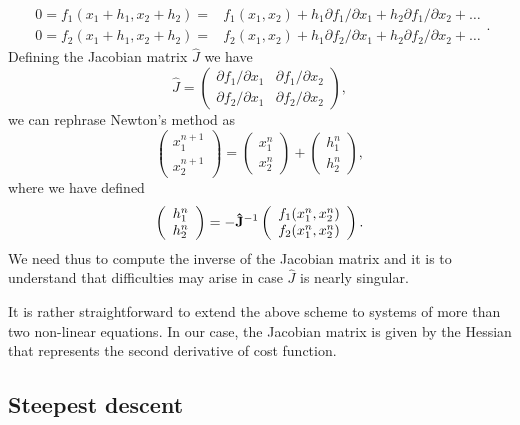 \documentclass[%
oneside,                 %
final,                   %
10pt]{article}
\begin{document}
\[
   \begin{array}{cc} 0=f_1(x_1+h_1,x_2+h_2)=&f_1(x_1,x_2)+h_1
                     \partial f_1/\partial x_1+h_2
                     \partial f_1/\partial x_2+\dots\\
                     0=f_2(x_1+h_1,x_2+h_2)=&f_2(x_1,x_2)+h_1
                     \partial f_2/\partial x_1+h_2
                     \partial f_2/\partial x_2+\dots
                       \end{array}.
\]
Defining the Jacobian matrix $\hat{J}$ we have
\[
 \hat{J}=\left( \begin{array}{cc}
                         \partial f_1/\partial x_1  & \partial f_1/\partial x_2 \\
                          \partial f_2/\partial x_1     &\partial f_2/\partial x_2
             \end{array} \right),
\]
we can rephrase Newton's method as
\[
\left(\begin{array}{c} x_1^{n+1} \\ x_2^{n+1} \end{array} \right)=
\left(\begin{array}{c} x_1^{n} \\ x_2^{n} \end{array} \right)+
\left(\begin{array}{c} h_1^{n} \\ h_2^{n} \end{array} \right),
\]
where we have defined
\[
   \left(\begin{array}{c} h_1^{n} \\ h_2^{n} \end{array} \right)=
   -{\bf \hat{J}}^{-1}
   \left(\begin{array}{c} f_1(x_1^{n},x_2^{n}) \\ f_2(x_1^{n},x_2^{n}) \end{array} \right).
\]
We need thus to compute the inverse of the Jacobian matrix and it
is to understand that difficulties  may
arise in case $\hat{J}$ is nearly singular.

It is rather straightforward to extend the above scheme to systems of
more than two non-linear equations. In our case, the Jacobian matrix is given by the Hessian that represents the second derivative of cost function. 



\subsection{Steepest descent}
\end{document}
